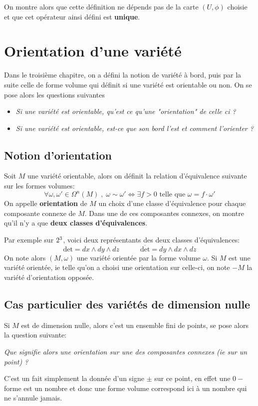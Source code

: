       On montre alors que cette définition ne dépends pas de la carte \( (U, \phi) \) choisie et que cet opérateur ainsi défini est \textbf{unique}.

\chapter{Orientation d'une variété}
   Dans le troisième chapitre, on a défini la notion de variété à bord, puis par la suite celle de forme volume qui définit si une variété est orientable ou non. On se pose alors les questions suivantes
   \begin{itemize}
      \item \textit{Si une variété est orientable, qu'est ce qu'une "orientation" de celle ci ?}
      \item \textit{Si une variété est orientable, est-ce que son bord l'est et comment l'orienter ?}
   \end{itemize}
   \section{Notion d'orientation}
      Soit \( M \) une variété orientable, alors on définit la relation d'équivalence suivante sur les formes volumes:
      \[ 
         \forall \omega, \omega' \in \Omega^n(M) \; , \; \omega \sim \omega' \iff \exists f > 0 \text{ telle que } \omega = f \cdot \omega' 
      \]
      On appelle \textbf{orientation} de \( M \) un choix d'une classe d'équivalence pour chaque composante connexe de \( M \). Dans une de ces composantes connexes, on montre qu'il n'y a que \textbf{deux classes d'équivalences}.

      Par exemple sur \( 2^3 \), voici deux représentants des deux classes d'équivalences:
      \[ 
         \text{det} = dx \wedge dy \wedge dz \quad\quad\quad \overline{\text{det}} = dy \wedge dx \wedge dz
      \]
      On note alors \( (M, \omega) \) une variété orientée par la forme volume \( \omega \). Si \( M \) est une variété orientée, ie telle qu'on a choisi une orientation sur celle-ci, on note \( -M \) la variété d'orientation opposée. 
   \section{Cas particulier des variétés de dimension nulle}
      Si \( M \) est de dimension nulle, alors c'est un ensemble fini de points, se pose alors la question suivante: 
      \begin{center}
         \textit{Que signifie alors une orientation sur une des composantes connexes (ie sur un point) ?}
      \end{center}
      C'est un fait simplement la donnée d'un signe \( \pm \) sur ce point, en effet une \( 0-\)forme est un nombre et donc une forme volume correspond ici à un nombre qui ne s'annule jamais.
